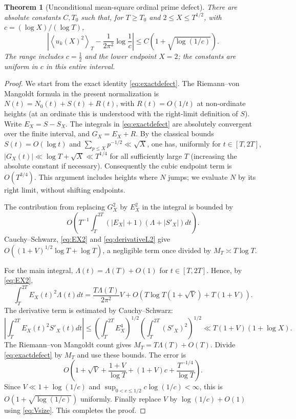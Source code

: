 \documentclass[11pt,reqno]{amsart}
\numberwithin{equation}{section}
\newtheorem{theorem}{Theorem}[section]
\newcommand{\av}[1]{\left\langle #1\right\rangle_T}
\begin{document}
\begin{theorem}[Unconditional mean-square ordinal prime defect]
\label{thm:primedefect}
There are absolute constants $C,T_0$ such that, for $T\ge T_0$
and $2\le X\le T^{1/2}$, with $c=(\log X)/(\log T)$,
\begin{equation}\label{eq:primedefect}
\left|\av{u_k(X)^2}-\frac1{2\pi^2}\log\frac1c\right|
 \le C\left(1+\sqrt{\log(1/c)}\right).
\end{equation}
The range includes $c=\frac12$ and the lower endpoint $X=2$;
the constants are uniform in $c$ in this entire interval.
\end{theorem}
\begin{proof}
We start from the exact identity \eqref{eq:exactdefect}.
The Riemann--von Mangoldt formula in the present normalization is
$N(t)=N_0(t)+S(t)+R(t)$, with $R(t)=O(1/t)$ at non-ordinate heights
(at an ordinate this is understood with the right-limit definition of $S$).
Write $E_X=S-S_X$.  The integrals in \eqref{eq:exactdefect}
are absolutely convergent over the finite interval, and
$G_X=E_X+R$.  By the classical bounds $S(t)=O(\log t)$ and
$\sum_{p\le X}p^{-1/2}\ll\sqrt X$, one has, uniformly
for $t\in[T,2T]$, $|G_X(t)|\ll\log T+\sqrt X\ll T^{1/4}$
for all sufficiently large $T$ (increasing the absolute constant
if necessary).  Consequently the cubic endpoint term is
$O(T^{3/4})$.  This argument includes heights where $N$ jumps;
we evaluate $N$ by its right limit, without shifting endpoints.

The contribution from replacing $G_X^2$ by $E_X^2$ in the integral
is bounded by
\[
O\left(T^{-1}\int_T^{2T}(|E_X|+1)(\Lambda+|S'_X|)dt\right).
\]
Cauchy--Schwarz, \eqref{eq:EX2} and \eqref{eq:derivativeL2}
give $O((1+V)^{1/2}\log T+\log T)$, a negligible term
once divided by $M_T\asymp T\log T$.

For the main integral, $\Lambda(t)=\Lambda(T)+O(1)$ for
$t\in[T,2T]$.  Hence, by \eqref{eq:EX2},
\begin{equation}\label{eq:thresholdmain}
\int_T^{2T}E_X(t)^2\Lambda(t)dt
=\frac{T\Lambda(T)}{2\pi^2}V
 +O(T\log T(1+\sqrt V)+T(1+V)).
\end{equation}
The derivative term is estimated by Cauchy--Schwarz:
\[
\left|\int_T^{2T}E_X(t)^2S'_X(t)dt\right|
\le\left(\int_T^{2T}E_X^4\right)^{1/2}
\left(\int_T^{2T}(S'_X)^2\right)^{1/2}
\ll T(1+V)(1+\log X).
\]
The Riemann--von Mangoldt count gives
$M_T=T\Lambda(T)+O(T)$.
Divide \eqref{eq:exactdefect} by $M_T$ and use these bounds.
The error is
\[
O\left(1+\sqrt V+\frac{1+V}{\log T}+(1+V)c
 +\frac{T^{-1/4}}{\log T}\right).
\]
Since $V\ll1+\log(1/c)$ and
$\sup_{0<c\le1/2}c\log(1/c)<\infty$,
this is $O(1+\sqrt{\log(1/c)})$ uniformly.
Finally replace $V$ by $\log(1/c)+O(1)$ using
\eqref{eq:Vsize}.  This completes the proof.
\end{proof}
\end{document}

